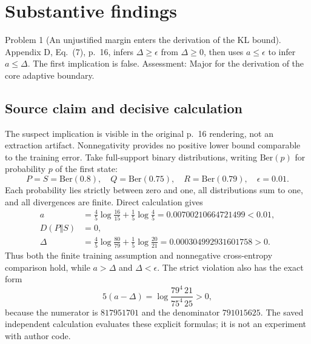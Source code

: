 \documentclass[10pt]{article}
\begin{document}
\section*{Substantive findings}
Problem 1 (An unjustified margin enters the derivation of the KL bound).  Appendix D, Eq. (7), p. 16, infers \(\Delta\ge\epsilon\) from \(\Delta\ge0\), then uses \(a\le\epsilon\) to infer \(a\le\Delta\). The first implication is false. Assessment: Major for the derivation of the core adaptive boundary.\par
\subsection*{Source claim and decisive calculation}
The suspect implication is visible in the original p. 16 rendering, not an extraction artifact. Nonnegativity provides no positive lower bound comparable to the training error. Take full-support binary distributions, writing \(\mathrm{Ber}(p)\) for probability \(p\) of the first state: \[P=S=\mathrm{Ber}(0.8),\quad Q=\mathrm{Ber}(0.75),\quad
 R=\mathrm{Ber}(0.79),\quad\epsilon=0.01.\] Each probability lies strictly between zero and one, all distributions sum to one, and all divergences are finite. Direct calculation gives \[\begin{aligned}
 a&=\frac45\log\frac{16}{15}+\frac15\log\frac45
   =0.00700210664721499<0.01,\\
 D(P\Vert S)&=0,\\
 \Delta&=\frac45\log\frac{80}{79}+\frac15\log\frac{20}{21}
   =0.000304992931601758>0.\end{aligned}\] Thus both the finite training assumption and nonnegative cross-entropy comparison hold, while \(a>\Delta\) and \(\Delta<\epsilon\). The strict violation also has the exact form \[5(a-\Delta)=\log\frac{79^4\,21}{75^4\,25}>0,\] because the numerator is \(817951701\) and the denominator \(791015625\). The saved independent calculation evaluates these explicit formulas; it is not an experiment with author code.\par
\end{document}
